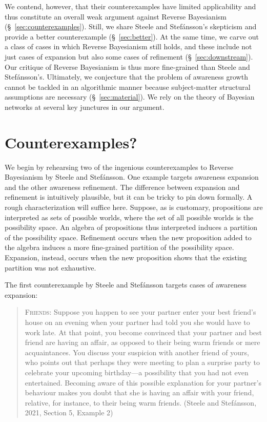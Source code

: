 \documentclass[
  11pt,
  dvipsnames,enabledeprecatedfontcommands]{scrartcl}
\begin{document}
We contend, however, that their counterexamples have limited
applicability and thus constitute an overall weak argument against
Reverse Bayesianism (\S ~\ref{sec:counterexamples}). Still, we share
Steele and Stefánsson's skepticism and provide a better counterexample
(\S ~\ref{sec:better}). At the same time, we carve out a class of cases
in which Reverse Bayesianism still holds, and these include not just
cases of expansion but also some cases of refinement
(\S ~\ref{sec:downstream}). Our critique of Reverse Bayesianism is thus
more fine-grained than Steele and Stefánsson's. Ultimately, we
conjecture that the problem of awareness growth cannot be tackled in an
algorithmic manner because subject-matter structural assumptions are
necessary (\S ~\ref{sec:material}). We rely on the theory of Bayesian
networks at several key junctures in our argument.

\hypertarget{counterexamples}{%
\section{Counterexamples?}\label{counterexamples}}

\label{sec:counterexamples}

We begin by rehearsing two of the ingenious counterexamples to Reverse
Bayesianism by Steele and Stefánsson. One example targets awareness
expansion and the other awareness refinement. The difference between
expansion and refinement is intuitively plausible, but it can be tricky
to pin down formally. A rough characterization will suffice here.
Suppose, as is customary, propositions are interpreted as sets of
possible worlds, where the set of all possible worlds is the possibility
space. An algebra of propositions thus interpreted induces a partition
of the possibility space. Refinement occurs when the new proposition
added to the algebra induces a more fine-grained partition of the
possibility space. Expansion, instead, occurs when the new proposition
shows that the existing partition was not exhaustive.

The first counterexample by Steele and Stefánsson targets cases of
awareness expansion:

\begin{quote}
\textsc{Friends}: Suppose you happen to see your partner enter your best
friend's house on an evening when your partner had told you she would
have to work late. At that point, you become convinced that your partner
and best friend are having an affair, as opposed to their being warm
friends or mere acquaintances. You discuss your suspicion with another
friend of yours, who points out that perhaps they were meeting to plan a
surprise party to celebrate your upcoming birthday---a possibility that
you had not even entertained. Becoming aware of this possible
explanation for your partner's behaviour makes you doubt that she is
having an affair with your friend, relative, for instance, to their
being warm friends. (Steele and Stefánsson, 2021, Section 5, Example 2)
\end{quote}
\end{document}
